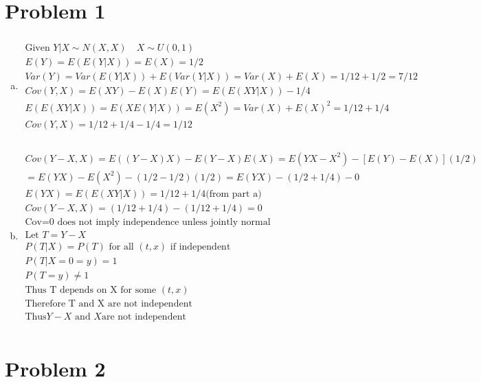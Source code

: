 \documentclass{article}
\begin{document}
\begin{flushleft}

	\section*{Problem 1}
	
\begin{enumerate}[(a)]
	
	\item 
\begin{multline*}\\
\text{Given } Y|X\sim N(X,X) \quad X\sim U(0,1)\\
E(Y)=E(E(Y|X))=E(X)=1/2\\
Var(Y)=Var(E(Y|X))+E(Var(Y|X))=Var(X)+E(X)=1/12+1/2=7/12\\
Cov(Y,X)=E(XY)-E(X)E(Y)=E(E(XY|X))-1/4\\
E(E(XY|X))=E(XE(Y|X))=E(X^2)=Var(X)+E(X)^2=1/12+1/4\\
Cov(Y,X)=1/12+1/4-1/4=1/12\\
\end{multline*}

	\item 
\begin{multline*}\\
Cov(Y-X,X)=E((Y-X)X)-E(Y-X)E(X)=E(YX-X^2)-[E(Y)-E(X)](1/2)\\
=E(YX)-E(X^2)-(1/2-1/2)(1/2)=E(YX)-(1/2+1/4)-0\\
E(YX)=E(E(XY|X))=1/12+1/4 \text{(from part a)}\\
Cov(Y-X,X)=(1/12+1/4)-(1/12+1/4)=0\\
\text{Cov=0 does not imply independence unless jointly normal}\\
\text{Let } T=Y-X\\
P(T|X)=P(T) \text{ for all } (t,x) \text{ if independent}\\
P(T|X=0=y)=1\\
P(T=y)\neq 1\\
\text{Thus T depends on X for some } (t,x)\\
\text{Therefore T and X are not independent}\\
\text{Thus} Y-X \text{ and } X \text{are not independent}\\
\end{multline*}

\end{enumerate}

	\section*{Problem 2}
\begin{enumerate}[(a)]
	

\end{enumerate}
\end{flushleft}
\end{document}
